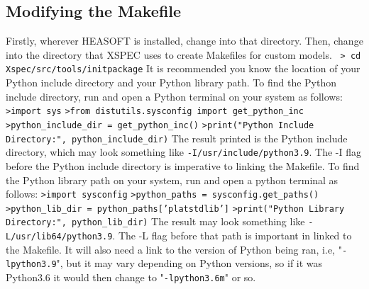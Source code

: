 \documentclass[12pt]{article}
\begin{document}
\subsection{Modifying the Makefile}\label{Makefile}
Firstly, wherever HEASOFT is installed, change into that directory. Then, change into the directory that XSPEC uses to create Makefiles for custom models. \newline
\indent\texttt{ > cd Xspec/src/tools/initpackage} \newline
It is recommended you know the location of your Python include directory and your Python library path. To find the Python include directory, run and open a Python terminal on your system as follows:\newline
\indent \texttt{>import sys} \newline
\indent\texttt{>from distutils.sysconfig import get\_python\_inc}\newline
\indent\texttt{>python\_include\_dir = get\_python\_inc()}\newline
\indent\texttt{>print("Python Include Directory:", python\_include\_dir)}\newline
The result printed is the Python include directory, which may look something like \newline
\texttt{-I/usr/include/python3.9}. The -I flag before the Python include directory is imperative to linking the Makefile. To find the Python library path on your system, run and open a python terminal as follows:\newline
\indent\texttt{>import sysconfig}\newline
\indent\texttt{>python\_paths = sysconfig.get\_paths()} \newline
\indent\texttt{>python\_lib\_dir = python\_paths['platstdlib']}\newline
\indent\texttt{>print("Python Library Directory:", python\_lib\_dir)}\newline
The result may look something like \texttt{-L/usr/lib64/python3.9}. The -L flag before that path is important in linked to the Makefile. It will also need a link to the version of Python being ran, i.e, "\texttt{-lpython3.9}", but it may vary depending on Python versions, so if it was Python3.6 it would then change to "\texttt{-lpython3.6m}" or so. \newline
\end{document}
